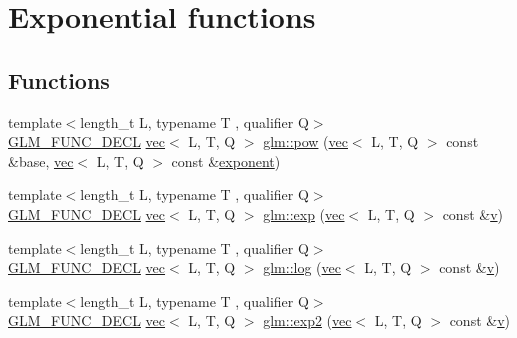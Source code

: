 \hypertarget{group__core__func__exponential}{}\section{Exponential functions}
\label{group__core__func__exponential}
\subsection*{Functions}
\begin{DoxyCompactItemize}
\item 
{\footnotesize template$<$length\+\_\+t L, typename T , qualifier Q$>$ }\\\hyperlink{setup_8hpp_ab2d052de21a70539923e9bcbf6e83a51}{G\+L\+M\+\_\+\+F\+U\+N\+C\+\_\+\+D\+E\+CL} \hyperlink{structglm_1_1vec}{vec}$<$ L, T, Q $>$ \hyperlink{group__core__func__exponential_ga2254981952d4f333b900a6bf5167a6c4}{glm\+::pow} (\hyperlink{structglm_1_1vec}{vec}$<$ L, T, Q $>$ const \&base, \hyperlink{structglm_1_1vec}{vec}$<$ L, T, Q $>$ const \&\hyperlink{_s_d_l__opengl__glext_8h_a5088c45c98574ff28866140a93356e75}{exponent})
\item 
{\footnotesize template$<$length\+\_\+t L, typename T , qualifier Q$>$ }\\\hyperlink{setup_8hpp_ab2d052de21a70539923e9bcbf6e83a51}{G\+L\+M\+\_\+\+F\+U\+N\+C\+\_\+\+D\+E\+CL} \hyperlink{structglm_1_1vec}{vec}$<$ L, T, Q $>$ \hyperlink{group__core__func__exponential_ga071566cadc7505455e611f2a0353f4d4}{glm\+::exp} (\hyperlink{structglm_1_1vec}{vec}$<$ L, T, Q $>$ const \&\hyperlink{_s_d_l__opengl_8h_a10a82eabcb59d2fcd74acee063775f90}{v})
\item 
{\footnotesize template$<$length\+\_\+t L, typename T , qualifier Q$>$ }\\\hyperlink{setup_8hpp_ab2d052de21a70539923e9bcbf6e83a51}{G\+L\+M\+\_\+\+F\+U\+N\+C\+\_\+\+D\+E\+CL} \hyperlink{structglm_1_1vec}{vec}$<$ L, T, Q $>$ \hyperlink{group__core__func__exponential_ga918c9f3fd086ce20e6760c903bd30fa9}{glm\+::log} (\hyperlink{structglm_1_1vec}{vec}$<$ L, T, Q $>$ const \&\hyperlink{_s_d_l__opengl_8h_a10a82eabcb59d2fcd74acee063775f90}{v})
\item 
{\footnotesize template$<$length\+\_\+t L, typename T , qualifier Q$>$ }\\\hyperlink{setup_8hpp_ab2d052de21a70539923e9bcbf6e83a51}{G\+L\+M\+\_\+\+F\+U\+N\+C\+\_\+\+D\+E\+CL} \hyperlink{structglm_1_1vec}{vec}$<$ L, T, Q $>$ \hyperlink{group__core__func__exponential_gaff17ace6b579a03bf223ed4d1ed2cd16}{glm\+::exp2} (\hyperlink{structglm_1_1vec}{vec}$<$ L, T, Q $>$ const \&\hyperlink{_s_d_l__opengl_8h_a10a82eabcb59d2fcd74acee063775f90}{v})

\end{DoxyCompactItemize}
